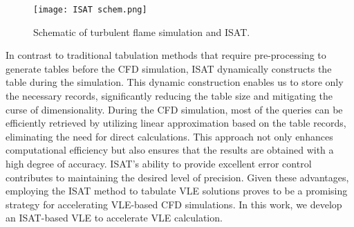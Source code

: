 \begin{figure}[htbp]
	\centering
	\texttt{[image: ISAT schem.png]}
	\caption{Schematic of turbulent flame simulation and ISAT.}
	\label{ISAT_Schematic}
\end{figure}

In contrast to traditional tabulation methods that require pre-processing to generate tables before the CFD simulation, ISAT dynamically constructs the table during the simulation. This dynamic construction enables us to store only the necessary records, significantly reducing the table size and mitigating the curse of dimensionality. During the CFD simulation, most of the queries can be efficiently retrieved by utilizing linear approximation based on the table records, eliminating the need for direct calculations. This approach not only enhances computational efficiency but also ensures that the results are obtained with a high degree of accuracy. ISAT's ability to provide excellent error control contributes to maintaining the desired level of precision. Given these advantages, employing the ISAT method to tabulate VLE solutions proves to be a promising strategy for accelerating VLE-based CFD simulations. In this work, we develop an ISAT-based VLE to accelerate VLE calculation.


